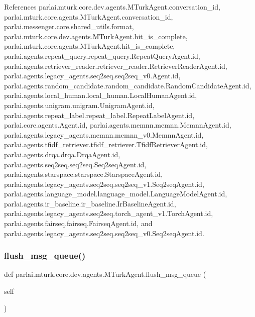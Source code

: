 References parlai.\+mturk.\+core.\+dev.\+agents.\+M\+Turk\+Agent.\+conversation\+\_\+id, parlai.\+mturk.\+core.\+agents.\+M\+Turk\+Agent.\+conversation\+\_\+id, parlai.\+messenger.\+core.\+shared\+\_\+utils.\+format, parlai.\+mturk.\+core.\+dev.\+agents.\+M\+Turk\+Agent.\+hit\+\_\+is\+\_\+complete, parlai.\+mturk.\+core.\+agents.\+M\+Turk\+Agent.\+hit\+\_\+is\+\_\+complete, parlai.\+agents.\+repeat\+\_\+query.\+repeat\+\_\+query.\+Repeat\+Query\+Agent.\+id, parlai.\+agents.\+retriever\+\_\+reader.\+retriever\+\_\+reader.\+Retriever\+Reader\+Agent.\+id, parlai.\+agents.\+legacy\+\_\+agents.\+seq2seq.\+seq2seq\+\_\+v0.\+Agent.\+id, parlai.\+agents.\+random\+\_\+candidate.\+random\+\_\+candidate.\+Random\+Candidate\+Agent.\+id, parlai.\+agents.\+local\+\_\+human.\+local\+\_\+human.\+Local\+Human\+Agent.\+id, parlai.\+agents.\+unigram.\+unigram.\+Unigram\+Agent.\+id, parlai.\+agents.\+repeat\+\_\+label.\+repeat\+\_\+label.\+Repeat\+Label\+Agent.\+id, parlai.\+core.\+agents.\+Agent.\+id, parlai.\+agents.\+memnn.\+memnn.\+Memnn\+Agent.\+id, parlai.\+agents.\+legacy\+\_\+agents.\+memnn.\+memnn\+\_\+v0.\+Memnn\+Agent.\+id, parlai.\+agents.\+tfidf\+\_\+retriever.\+tfidf\+\_\+retriever.\+Tfidf\+Retriever\+Agent.\+id, parlai.\+agents.\+drqa.\+drqa.\+Drqa\+Agent.\+id, parlai.\+agents.\+seq2seq.\+seq2seq.\+Seq2seq\+Agent.\+id, parlai.\+agents.\+starspace.\+starspace.\+Starspace\+Agent.\+id, parlai.\+agents.\+legacy\+\_\+agents.\+seq2seq.\+seq2seq\+\_\+v1.\+Seq2seq\+Agent.\+id, parlai.\+agents.\+language\+\_\+model.\+language\+\_\+model.\+Language\+Model\+Agent.\+id, parlai.\+agents.\+ir\+\_\+baseline.\+ir\+\_\+baseline.\+Ir\+Baseline\+Agent.\+id, parlai.\+agents.\+legacy\+\_\+agents.\+seq2seq.\+torch\+\_\+agent\+\_\+v1.\+Torch\+Agent.\+id, parlai.\+agents.\+fairseq.\+fairseq.\+Fairseq\+Agent.\+id, and parlai.\+agents.\+legacy\+\_\+agents.\+seq2seq.\+seq2seq\+\_\+v0.\+Seq2seq\+Agent.\+id.

\mbox{\label{classparlai_1_1mturk_1_1core_1_1dev_1_1agents_1_1MTurkAgent_ac7a88bfcda18d7ac1862e09042cf6bd6}} 
\subsubsection{\texorpdfstring{flush\+\_\+msg\+\_\+queue()}{flush\_msg\_queue()}}
{\footnotesize\ttfamily def parlai.\+mturk.\+core.\+dev.\+agents.\+M\+Turk\+Agent.\+flush\+\_\+msg\+\_\+queue (\begin{DoxyParamCaption}\item[{}]{self }\end{DoxyParamCaption})}

